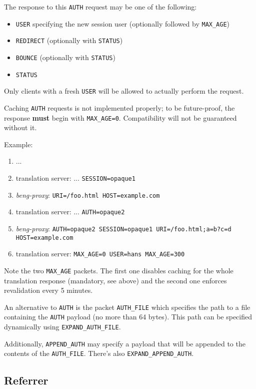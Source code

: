 \documentclass[a4paper,12pt]{article}
\begin{document}
The response to this \texttt{AUTH} request may be one of the
following:

\begin{itemize}
\item \texttt{USER} specifying the new session user (optionally
  followed by \verb|MAX_AGE|)
\item \texttt{REDIRECT} (optionally with \texttt{STATUS})
\item \texttt{BOUNCE} (optionally with \texttt{STATUS})
\item \texttt{STATUS}
\end{itemize}

Only clients with a fresh \texttt{USER} will be allowed to actually
perform the request.

Caching \texttt{AUTH} requests is not implemented properly; to be
future-proof, the response \textbf{must} begin with \verb|MAX_AGE=0|.
Compatibility will not be guaranteed without it.

Example:

\begin{enumerate}
\item ...
\item translation server: ... \texttt{SESSION=opaque1}
\item \emph{beng-proxy}: \texttt{URI=/foo.html HOST=example.com}
\item translation server: ... \texttt{AUTH=opaque2}
\item \emph{beng-proxy}: \texttt{AUTH=opaque2 SESSION=opaque1 URI=/foo.html;a=b?c=d HOST=example.com}
\item translation server: \texttt{MAX\_AGE=0 USER=hans MAX\_AGE=300}
\end{enumerate}

Note the two \verb|MAX_AGE| packets.  The first one disables caching
for the whole translation response (mandatory, see above) and the
second one enforces revalidation every 5 minutes.

An alternative to \verb|AUTH| is the packet \verb|AUTH_FILE| which
specifies the path to a file containing the \verb|AUTH| payload (no
more than 64 bytes).  This path can be specified dynamically using
\verb|EXPAND_AUTH_FILE|.

Additionally, \verb|APPEND_AUTH| may specify a payload that will be
appended to the contents of the \verb|AUTH_FILE|.  There's also
\verb|EXPAND_APPEND_AUTH|.


\subsection{Referrer}
\end{document}
